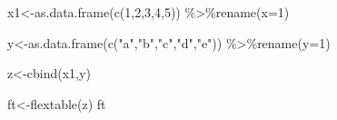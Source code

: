 \documentclass[
]{book}
\newenvironment{Shaded}{\begin{snugshade}}{\end{snugshade}}
\newcommand{\AttributeTok}[1]{\textcolor[rgb]{0.77,0.63,0.00}{#1}}
\newcommand{\DecValTok}[1]{\textcolor[rgb]{0.00,0.00,0.81}{#1}}
\newcommand{\FunctionTok}[1]{\textcolor[rgb]{0.00,0.00,0.00}{#1}}
\newcommand{\NormalTok}[1]{#1}
\newcommand{\OtherTok}[1]{\textcolor[rgb]{0.56,0.35,0.01}{#1}}
\newcommand{\SpecialCharTok}[1]{\textcolor[rgb]{0.00,0.00,0.00}{#1}}
\newcommand{\StringTok}[1]{\textcolor[rgb]{0.31,0.60,0.02}{#1}}
\begin{document}
\begin{Shaded}
\begin{Highlighting}[]
\NormalTok{x1}\OtherTok{\textless{}{-}}\FunctionTok{as.data.frame}\NormalTok{(}\FunctionTok{c}\NormalTok{(}\DecValTok{1}\NormalTok{,}\DecValTok{2}\NormalTok{,}\DecValTok{3}\NormalTok{,}\DecValTok{4}\NormalTok{,}\DecValTok{5}\NormalTok{)) }\SpecialCharTok{\%\textgreater{}\%}\FunctionTok{rename}\NormalTok{(}\AttributeTok{x=}\DecValTok{1}\NormalTok{)}

\NormalTok{y}\OtherTok{\textless{}{-}}\FunctionTok{as.data.frame}\NormalTok{(}\FunctionTok{c}\NormalTok{(}\StringTok{"a"}\NormalTok{,}\StringTok{"b"}\NormalTok{,}\StringTok{"c"}\NormalTok{,}\StringTok{"d"}\NormalTok{,}\StringTok{"e"}\NormalTok{))  }\SpecialCharTok{\%\textgreater{}\%}\FunctionTok{rename}\NormalTok{(}\AttributeTok{y=}\DecValTok{1}\NormalTok{)}

\NormalTok{z}\OtherTok{\textless{}{-}}\FunctionTok{cbind}\NormalTok{(x1,y)}

\NormalTok{ft}\OtherTok{\textless{}{-}}\FunctionTok{flextable}\NormalTok{(z)}
\NormalTok{ft}
\end{Highlighting}
\end{Shaded}

\providecommand{\docline}[3]{\noalign{\global\setlength{\arrayrulewidth}{#1}}\arrayrulecolor[HTML]{#2}\cline{#3}}

\setlength{\tabcolsep}{2pt}

\renewcommand*{\arraystretch}{1.5}
\end{document}
